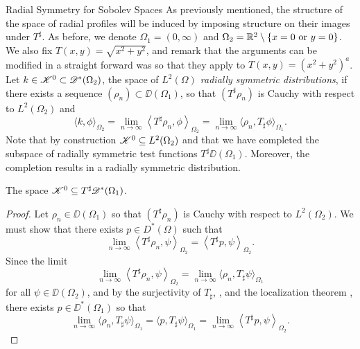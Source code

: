 \begin{chapter}{Radial Symmetry for Sobolev Spaces}
As previously mentioned, the structure of the space of radial profiles will be induced by imposing structure on their images under $T^\sharp$.
As before, we denote $\Omega_1 = (0,\infty)$ and $\Omega_2 = \mathbb R^2\setminus\{x=0\text{ or }y=0\}$.  
We also fix $T(x,y) = \sqrt{x^2+y^2}$, and remark that the arguments can be modified in a straight forward was so that they apply to $T(x,y) = (x^2 + y^2)^a$. 
Let $k\in \mathscr K^0 \subset \mathscr D^*(\Omega_2)$, the space of \emph{$L^2(\Omega)$ radially symmetric distributions}, if there exists a sequence $(\rho_n) \subset \DD(\Omega_1)$, so that $(T^\sharp \rho_n)$ is Cauchy with respect to $L^2(\Omega_2)$ and
\begin{equation} \label{eq:cauchySequenceCorrespondence}
  \Big\langle k,\phi\Big\rangle_{\Omega_2} = \lim_{n\to\infty}\left\langle T^\sharp \rho_n, \phi\right\rangle_{\Omega_2} = \lim_{n\to\infty}\Big\langle \rho_n, T_\sharp \phi\Big\rangle_{\Omega_1}.
\end{equation}
Note that by construction $\mathscr K^0 \subseteq L^2(\Omega_2)$ and that we have completed the subspace of radially symmetric test functions $T^\sharp \DD(\Omega_1)$.
Moreover, the completion results in a radially symmetric distribution.
\begin{prop}
  The space $\mathscr K^0 \subseteq T^\sharp \mathscr D^*(\Omega_1)$.
\end{prop}
\begin{proof}
  Let $\rho_n \in \DD(\Omega_1)$ so that $(T^\sharp \rho_n)$ is Cauchy with respect to $L^2(\Omega_2)$.
  We must show that there exists $p \in D^*(\Omega)$ such that
  \begin{equation}
    \lim_{n\to\infty} \left\langle T^\sharp \rho_n,\psi\right\rangle_{\Omega_2} = \left\langle T^\sharp p,\psi \right\rangle_{\Omega_2}.
  \end{equation}
  Since the limit
  \begin{equation}
    \lim_{n\to\infty} \left\langle T^\sharp \rho_n, \psi \right\rangle_{\Omega_2}
    = \lim_{n\to\infty} \Big\langle \rho_n, T_\sharp \psi \Big\rangle_{\Omega_1}
  \end{equation}
  for all $\psi\in \DD(\Omega_2)$, and by the surjectivity of $T_\sharp$, , and the localization theorem , there exists $p \in \DD^*(\Omega_1)$ so that
  \begin{equation}
     \lim_{n\to\infty} \Big\langle \rho_n, T_\sharp \psi \Big\rangle_{\Omega_1} = \Big\langle p,T_\sharp \psi \Big\rangle_{\Omega_1} = \lim_{n\to\infty} \left\langle T^\sharp p, \psi \right\rangle_{\Omega_2}.
  \end{equation}
\end{proof}


\end{chapter}
